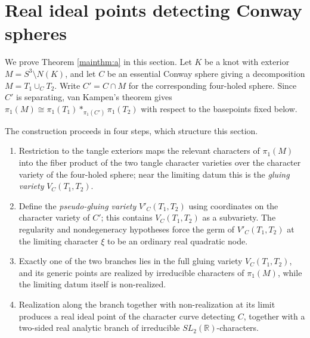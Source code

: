 \documentclass{article}
\theoremstyle{plain}
\theoremstyle{definition}
\theoremstyle{plain}
\theoremstyle{plain}
\theoremstyle{plain}
\theoremstyle{remark}
\newtheorem{remark}[theorem]{Remark}
\theoremstyle{remark}
\theoremstyle{plain}
\theoremstyle{plain}
\newcounter{main}
\theoremstyle{plain}
\theoremstyle{plain}
\begin{document}
%
%	

\section{Real ideal points detecting Conway spheres}\label{sec:idealpoints}

We prove Theorem \ref{mainthm:a} in this section. Let $K$ be a knot with exterior $M = S^3 \setminus N(K)$, and let $C$ be an essential Conway sphere giving a decomposition $M = T_1 \cup_C T_2$. Write $C' = C \cap M$ for the corresponding four-holed sphere. Since $C'$ is separating, van Kampen's theorem gives $\pi_1(M) \cong \pi_1(T_1) *_{\pi_1(C')}\pi_1(T_2)$ with respect to the basepoints fixed below.

\medskip

The construction proceeds in four steps, which structure this section. 
\begin{enumerate}
	\item Restriction to the tangle exteriors maps the relevant characters of $\pi_1(M)$ into the fiber product of the two tangle character varieties over the character variety of the four-holed sphere; near the limiting datum this is the \emph{gluing variety} $V_C(T_1, T_2)$.
	\item Define the \emph{pseudo-gluing variety} $V'_C(T_1, T_2)$ using coordinates on the character variety of $C'$; this contains $V_C(T_1, T_2)$ as a subvariety. The regularity and nondegeneracy hypotheses force the germ of $V'_C(T_1, T_2)$ at the limiting character $\xi$ to be an ordinary real quadratic node.
	\item Exactly one of the two branches lies in the full gluing variety $V_C(T_1, T_2)$, and its generic points are realized by irreducible characters of $\pi_1(M)$, while the limiting datum itself is non-realized.
	\item Realization along the branch together with non-realization at its limit produces a real ideal point of the character curve detecting $C$, together with a two-sided real analytic branch of irreducible $SL_2(\mathbb{R})$-characters.
\end{enumerate} 
\end{document}
